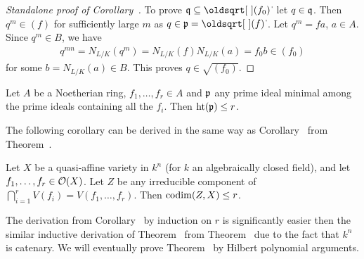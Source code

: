 \documentclass[a4paper,parskip=half,numbers=enddot, DIV=12, headheight=30pt]{scrreprt}
\begin{document}
\begin{proof}[Standalone proof of Corollary~]
	To prove $\qq\subseteq\sqrt{(f_0)}$ let $q\in\mathfrak{q}$. Then $q^m\in (f)$ for sufficiently large $m$ as $q\in\pp=\sqrt{(f)}$. Let $q^m=fa$, $a\in A$. Since $q^m\in B$, we have 
	\begin{align*}
		q^{mn}=N_{L/K}(q^m)=N_{L/K}(f)N_{L/K}(a)=f_0b\in(f_0)
	\end{align*}
	for some $b=N_{L/K}(a)\in B$. This proves $q\in\sqrt{(f_0)}$.
\end{proof}
\begin{thm}
    Let $A$ be a Noetherian ring, $f_1,\ldots,f_r\in A$ and $\mathfrak{p}$ any prime ideal minimal among the prime ideals containing all the $f_i$. Then $\operatorname{ht}(\mathfrak{p})\leq r$.
\end{thm}    
The following corollary can be derived in the same way as Corollary~ from Theorem~.
\begin{cor}
    Let $X$ be a quasi-affine variety in $k^n$ (for $k$ an algebraically closed field), and let $f_1,\ldots,f_r\in \mathcal{O}(X)$. Let $Z$ be any irreducible component of $\bigcap_{i=1}^r V(f_i)=V(f_1,\ldots,f_r)$. Then $\operatorname{codim}(Z,X)\leq r$.
\end{cor}
The derivation from Corollary~ by induction on $r$ is significantly easier then the similar inductive derivation of Theorem~ from Theorem~ due to the fact that $k^n$ is catenary. We will eventually prove Theorem~ by Hilbert polynomial arguments.
\end{document}
